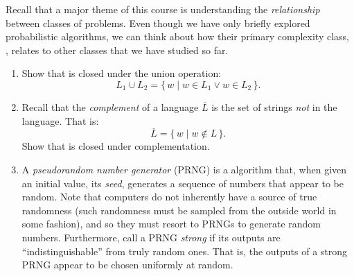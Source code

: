 \newcommand{\shrug}{\ensuremath{\stackrel{?}{=}}}

\newcommand{\prob}[1]{\ensuremath{\mathsf{#1}}\xspace}
\newcommand{\desc}[1]{\ensuremath{\langle #1 \rangle}}
\newcommand{\comp}[1]{\ensuremath{\overline{#1}}\xspace}




\begin{problem}

Recall that a major theme of this course is understanding the
\emph{relationship} between classes of problems.  Even though we have only
briefly explored probabilistic algorithms, we can think about how their primary
complexity class, \BPP, relates to other classes that we have studied so far.

\begin{enumerate}
  \item Show that \BPP is closed under the union operation:
    \[
      L_1 \cup L_2 = \{\, w \mid w \in L_1 \vee w \in L_2 \,\}.
    \]
  \item Recall that the \emph{complement} of a language \( \comp{L} \) is
    the set of strings \emph{not} in the language.  That is:
    \[
      \comp{L} = \{\, w \mid w \notin L \,\}.
    \]
    Show that \BPP is closed under complementation.
  \item A \emph{pseudorandom number generator} (PRNG) is a algorithm that, when
    given an initial value, its \emph{seed}, generates a sequence of numbers
    that appear to be random.  Note that computers do not inherently have a
    source of true randomness (such randomness must be sampled from the outside
    world in some fashion), and so they must resort to PRNGs to generate random
    numbers. Furthermore, call a PRNG \emph{strong} if its outputs are
    ``indistinguishable'' from truly random ones.  That is, the outputs of a
    strong PRNG appear to be chosen uniformly at random.


\end{enumerate}
\end{problem}
